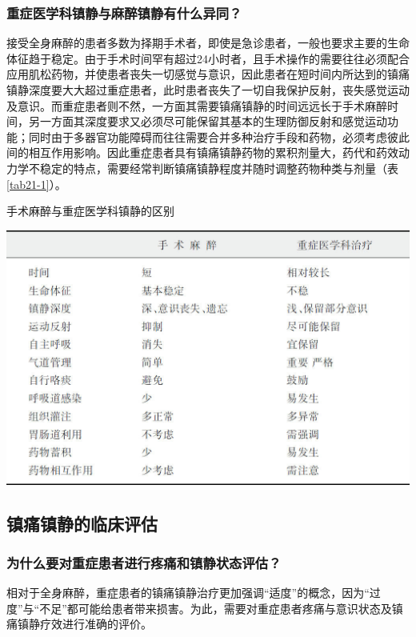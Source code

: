 \subsubsection{重症医学科镇静与麻醉镇静有什么异同？}

接受全身麻醉的患者多数为择期手术者，即使是急诊患者，一般也要求主要的生命体征趋于稳定。由于手术时间罕有超过24小时者，且手术操作的需要往往必须配合应用肌松药物，并使患者丧失一切感觉与意识，因此患者在短时间内所达到的镇痛镇静深度要大大超过重症患者，此时患者丧失了一切自我保护反射，丧失感觉运动及意识。而重症患者则不然，一方面其需要镇痛镇静的时间远远长于手术麻醉时间，另一方面其深度要求又必须尽可能保留其基本的生理防御反射和感觉运动功能；同时由于多器官功能障碍而往往需要合并多种治疗手段和药物，必须考虑彼此间的相互作用影响。因此重症患者具有镇痛镇静药物的累积剂量大，药代和药效动力学不稳定的特点，需要经常判断镇痛镇静程度并随时调整药物种类与剂量（表\ref{tab21-1}）。

\begin{table}[htbp]
\centering
\caption{手术麻醉与重症医学科镇静的区别}
\label{tab21-1}
\includegraphics{./images/Image00226.jpg}
\end{table}

\subsection{镇痛镇静的临床评估}

\subsubsection{为什么要对重症患者进行疼痛和镇静状态评估？}

相对于全身麻醉，重症患者的镇痛镇静治疗更加强调“适度”的概念，因为“过度”与“不足”都可能给患者带来损害。为此，需要对重症患者疼痛与意识状态及镇痛镇静疗效进行准确的评价。

